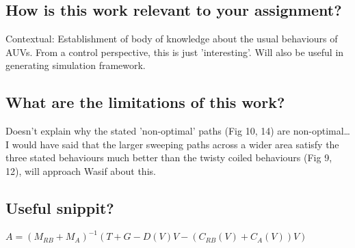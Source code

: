\documentclass[a4paper]{report}
\begin{document}
\subsection{How is this work relevant to your assignment?}
Contextual: Establishment of body of knowledge about the usual behaviours of AUVs. From a control perspective, this is just 'interesting'. Will also be useful in generating simulation framework.
\subsection{What are the limitations of this work?}
Doesn't explain why the stated 'non-optimal' paths (Fig 10, 14) are non-optimal\ldots I would have said that the larger sweeping paths across a wider area satisfy the three stated behaviours much better than the twisty coiled behaviours (Fig 9, 12), will approach Wasif about this.
\subsection{Useful snippit?}
\begin{math}
  A = (M_{RB}+M_A)^{-1}(T+G-D(V)V-(C_{RB}(V)+C_A(V))V)
\end{math}
\end{document}
